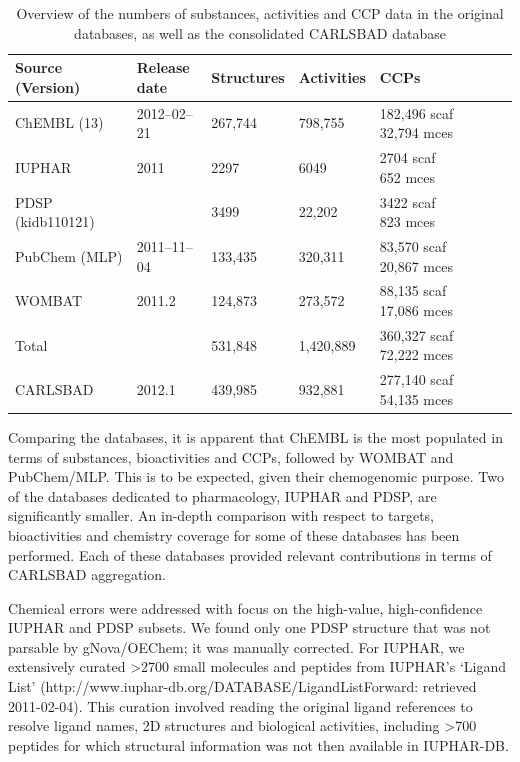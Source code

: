 \begin{table}
\caption{Overview of the numbers of substances, activities and CCP data in the original databases, as well as the consolidated CARLSBAD database}
\label{tab:cb_02}
\centering
\begin{tabular}{p{0.25\linewidth}p{0.15\linewidth}p{0.15\linewidth}p{0.15\linewidth}p{0.30\linewidth}}
\hline
\textbf{Source (Version)} & \textbf{Release date} & \textbf{Structures} & \textbf{Activities} & \textbf{CCPs} \\
\hline
ChEMBL (13) & 2012–02–21 & 267,744 & 798,755 & \makecell[l]{182,496 scaf \\ 32,794 mces} \\
IUPHAR & 2011 & 2297 & 6049 & \makecell[l]{2704 scaf \\ 652 mces} \\
PDSP (kidb110121) & & 3499 & 22,202 & \makecell[l]{3422 scaf \\ 823 mces} \\
PubChem (MLP) & 2011–11–04 & 133,435 & 320,311 & \makecell[l]{83,570 scaf \\ 20,867 mces} \\
WOMBAT & 2011.2 & 124,873  & 273,572 & \makecell[l]{88,135 scaf \\ 17,086 mces} \\
\hline
Total & & 531,848 & 1,420,889 & \makecell[l]{360,327 scaf \\ 72,222 mces} \\
\hline
CARLSBAD & 2012.1 & 439,985 & 932,881 & \makecell[l]{277,140 scaf \\ 54,135 mces} \\
\hline
\end{tabular}
\end{table}

Comparing the databases, it is apparent that ChEMBL is the most populated in terms of substances, bioactivities and CCPs, followed by WOMBAT and PubChem/MLP. This is to be expected, given their chemogenomic purpose. Two of the databases dedicated to pharmacology, IUPHAR and PDSP, are significantly smaller. An in-depth comparison with respect to targets, bioactivities and chemistry coverage for some of these databases has been performed\cite{Tiikkainen2012-cw}. Each of these databases provided relevant contributions in terms of CARLSBAD aggregation.

Chemical errors were addressed with focus on the high-value, high-confidence IUPHAR and PDSP subsets. We found only one PDSP structure that was not parsable by gNova/OEChem; it was manually corrected. For IUPHAR, we extensively curated \textgreater 2700 small molecules and peptides from IUPHAR’s ‘Ligand List’ (http://www.iuphar-db.org/DATABASE/LigandListForward: retrieved 2011-02-04). This curation involved reading the original ligand references to resolve ligand names, 2D structures and biological activities, including \textgreater700 peptides for which structural information was not then available in IUPHAR-DB\cite{Harding2018-ut}. 

